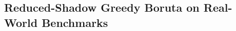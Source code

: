 \documentclass[runningheads]{llncs}
\begin{document}
\subsection{Reduced-Shadow Greedy Boruta on Real-World Benchmarks}


\end{document}
